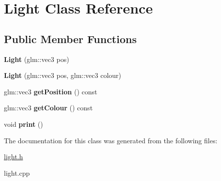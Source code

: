 \hypertarget{class_light}{}\section{Light Class Reference}
\label{class_light}
\subsection*{Public Member Functions}
\begin{DoxyCompactItemize}
\item 
\mbox{\label{class_light_a62bbd4eb90c31a7e07a3153b7ce5d1d4}} 
{\bfseries Light} (glm\+::vec3 pos)
\item 
\mbox{\label{class_light_ab2624427110cf6d5d905159d70c827b6}} 
{\bfseries Light} (glm\+::vec3 pos, glm\+::vec3 colour)
\item 
\mbox{\label{class_light_a24d3c226daf99f57427a0cb4b75605a7}} 
glm\+::vec3 {\bfseries get\+Position} () const
\item 
\mbox{\label{class_light_ad00d8f1eba15a5d25b034f64e5bb4c43}} 
glm\+::vec3 {\bfseries get\+Colour} () const
\item 
\mbox{\label{class_light_a99d3d45283ee007ffc8b19c0d7d27077}} 
void {\bfseries print} ()
\end{DoxyCompactItemize}


The documentation for this class was generated from the following files\+:\begin{DoxyCompactItemize}
\item 
\mbox{\hyperlink{light_8h}{light.\+h}}\item 
light.\+cpp\end{DoxyCompactItemize}
